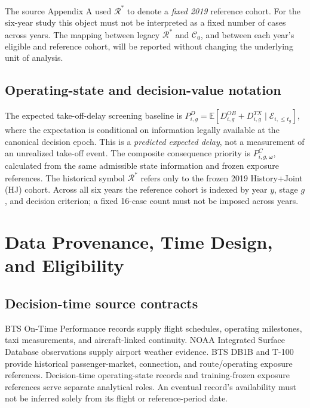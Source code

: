 \documentclass[10pt,a4paper]{article}
\numberwithin{equation}{section}
\begin{document}
The source Appendix A used $\mathcal R^*$ to denote a \emph{fixed 2019} reference cohort. For the six-year study this object must not be interpreted as a fixed number of cases across years. The mapping between legacy $\mathcal R^*$ and $\mathcal C_0$, and between each year's eligible and reference cohort, will be reported without changing the underlying unit of analysis.

\subsection{Operating-state and decision-value notation}
The expected take-off-delay screening baseline is
$P^D_{i,g}=\mathbb E[D^{OB}_{i,g}+D^{TX}_{i,g}\mid\mathcal E_{i,\leq t_g}]$, where the expectation is conditional on information legally available at the canonical decision epoch. This is a \emph{predicted expected delay}, not a measurement of an unrealized take-off event. The composite consequence priority is $P^C_{i,g,\boldsymbol\omega}$, calculated from the same admissible state information and frozen exposure references. The historical symbol $\mathcal R^*$ refers only to the frozen 2019 History+Joint (HJ) cohort. Across all six years the reference cohort is indexed by year $y$, stage $g$, and decision criterion; a fixed 16-case count must not be imposed across years.


\section{Data Provenance, Time Design, and Eligibility}
\label{sup:data}
\subsection{Decision-time source contracts}
BTS On-Time Performance records supply flight schedules, operating milestones, taxi measurements, and aircraft-linked continuity. NOAA Integrated Surface Database observations supply airport weather evidence. BTS DB1B and T-100 provide historical passenger-market, connection, and route/operating exposure references. Decision-time operating-state records and training-frozen exposure references serve separate analytical roles. An eventual record's availability must not be inferred solely from its flight or reference-period date.
\end{document}
